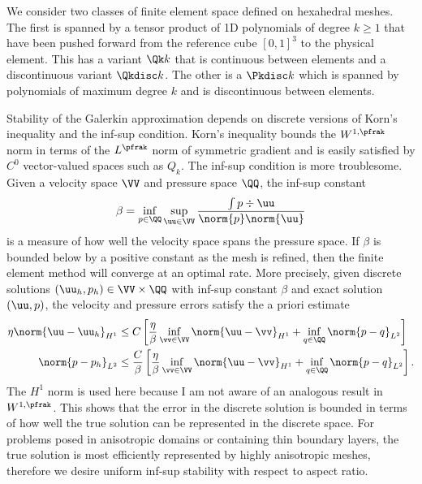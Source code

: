 We consider two classes of finite element space defined on hexahedral meshes.
The first is spanned by a tensor product of 1D polynomials of degree $k \ge 1$ that have been pushed forward from the reference cube $[0,1]^3$ to the physical element.
This has a variant $\Qk k$ that is continuous between elements and a discontinuous variant $\Qkdisc k$.
The other is a $\Pkdisc k$ which is spanned by polynomials of maximum degree $k$ and is discontinuous between elements.

Stability of the Galerkin approximation depends on discrete versions of Korn's inequality and the inf-sup condition.
Korn's inequality bounds the $W^{1,\pfrak}$ norm in terms of the $L^\pfrak$ norm of symmetric gradient and is easily satisfied by $C^0$ vector-valued spaces such as $Q_k$.
The inf-sup condition is more troublesome.
Given a velocity space $\VV$ and pressure space $\QQ$, the inf-sup constant
\begin{equation}\label{eq:slip:inf-sup}
  \beta = \inf_{p\in \QQ} \sup_{\uu\in\VV} \frac{\int p\div\uu}{\norm{p} \norm{\uu}}
\end{equation}
is a measure of how well the velocity space spans the pressure space.
If $\beta$ is bounded below by a positive constant as the mesh is refined, then the finite element method will converge at an optimal rate.
More precisely, given discrete solutions $(\uu_h,p_h) \in \VV \times \QQ$ with inf-sup constant $\beta$ and exact solution $(\uu,p)$, the velocity and pressure errors satisfy the a priori estimate~\citep{brezzi1991mixed}
\begin{subequations}\label{eq:slip:apriori}
\begin{align}
  \eta \norm{\uu - \uu_h}_{H^1} & \le C \left[ \frac{\eta}{\beta} \inf_{\vv \in \VV} \norm{\uu - \vv}_{H^1} + \inf_{q \in \QQ} \norm{p-q}_{L^2} \right] \\
  \norm{p - p_h}_{L^2} & \le \frac{C}{\beta} \left[ \frac{\eta}{\beta} \inf_{\vv \in \VV} \norm{\uu - \vv}_{H^1} + \inf_{q\in\QQ} \norm{p-q}_{L^2} \right] .
\end{align}
\end{subequations}
The $H^1$ norm is used here because I am not aware of an analogous result in $W^{1,\pfrak}$.
This shows that the error in the discrete solution is bounded in terms of how well the true solution can be represented in the discrete space.
For problems posed in anisotropic domains or containing thin boundary layers, the true solution is most efficiently represented by highly anisotropic meshes, therefore we desire uniform inf-sup stability with respect to aspect ratio.

